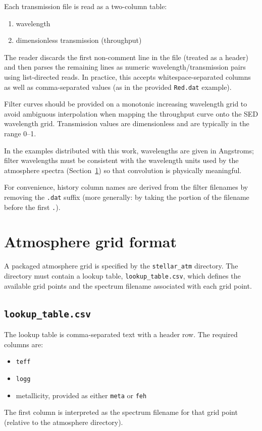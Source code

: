\documentclass[linenumbers,apj,twocolumn, floatfix]{aastex701}
\begin{document}
Each transmission file is read as a two-column table:
\begin{enumerate}
  \item wavelength
  \item dimensionless transmission (throughput)
\end{enumerate}

The reader discards the first non-comment line in the file (treated as a header) and then parses the remaining lines as numeric wavelength/transmission pairs using list-directed reads. In practice, this accepts whitespace-separated columns as well as comma-separated values (as in the provided \texttt{Red.dat} example).

Filter curves should be provided on a monotonic increasing wavelength grid to avoid ambiguous interpolation when mapping the throughput curve onto the SED wavelength grid. Transmission values are dimensionless and are typically in the range 0--1.

In the examples distributed with this work, wavelengths are given in Angstroms; filter wavelengths must be consistent with the wavelength units used by the atmosphere spectra (Section~\ref{sec:atm_grid_format}) so that convolution is physically meaningful.

For convenience, history column names are derived from the filter filenames by removing the \texttt{.dat} suffix (more generally: by taking the portion of the filename before the first \texttt{.}).

\section{Atmosphere grid format}
\label{sec:atm_grid_format}

A packaged atmosphere grid is specified by the \texttt{stellar\_atm} directory. The directory must contain a lookup table,
\texttt{lookup\_table.csv}, which defines the available grid points and the spectrum filename associated with each grid point.

\subsection{\texttt{lookup\_table.csv}}

The lookup table is comma-separated text with a header row. The required columns are:
\begin{itemize}
  \item \texttt{teff}
  \item \texttt{logg}
  \item metallicity, provided as either \texttt{meta} or \texttt{feh}
\end{itemize}
The first column is interpreted as the spectrum filename for that grid point (relative to the atmosphere directory).
\end{document}
